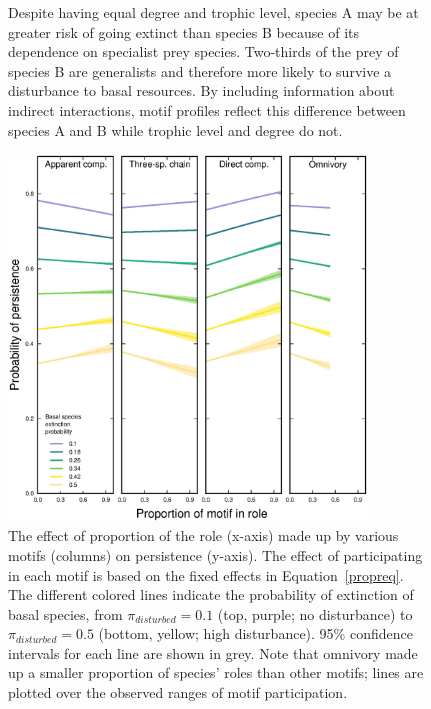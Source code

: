 \documentclass[12pt]{article}
\begin{document}
\begin{spacing}{2.0}
\begin{figure}[hb!]
{        Despite having equal degree and trophic level, species A may be at greater risk of going extinct than species B because of its dependence on specialist prey species. Two-thirds of the prey of species B are generalists and therefore more likely to survive a disturbance to basal resources. By including information about indirect interactions, motif profiles reflect this difference between species A and B while trophic level and degree do not.}
    \label{fig:concept}
    \end{figure}

    
        \begin{figure}[hb!]
        \centering
        \includegraphics[width=0.85\textwidth]{figures/persistence_motif_participation.eps}
        \caption{The effect of proportion of the role (x-axis) made up by various motifs (columns) on persistence (y-axis). The effect of participating in each motif is based on the fixed effects in Equation~\ref{propreq}. The different colored lines indicate the probability of extinction of basal species, from $\pi_{disturbed} = 0.1$ (top, purple; no disturbance) to $\pi_{disturbed} = 0.5$ (bottom, yellow; high disturbance). 95\% confidence intervals for each line are shown in grey. Note that omnivory made up a smaller proportion of species' roles than other motifs; lines are plotted over the observed ranges of motif participation.}
    \label{fig:prop_lmer_all}
    \end{figure}
        


\end{spacing}
\end{document}
